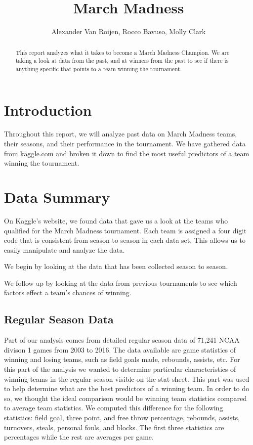 \documentclass[]{scrartcl}
\title{March Madness}
\author{Alexander Van Roijen, Rocco Bavuso, Molly Clark}
\begin{document}
\maketitle

\begin{abstract}
This report analyzes what it takes to become a March Madness Champion. We are taking a look at data from the past, and at winners from the past to see if there is anything specific that points to a team winning the tournament.
\end{abstract}

\section*{Introduction}
Throughout this report, we will analyze past data on March Madness teams, their seasons, and their performance in the tournament. We have gathered data from kaggle.com and broken it down to find the most useful predictors of a team winning the tournament.
\section*{Data Summary}
On Kaggle's website, we found data that gave us a look at the teams who qualified for the March Madness tournament. Each team is assigned a four digit code that is consistent from season to season in each data set. This allows us to easily manipulate and analyze the data.

We begin by looking at the data that has been collected season to season.

We follow up by looking at the data from previous tournaments to see which factors effect a team's chances of winning.
\subsection*{Regular Season Data}
Part of our analysis comes from detailed regular season data of 71,241 NCAA divison 1 games from 2003 to 2016. The data available are game statistics of winning and losing teams, such as field goals made, rebounds, assists, etc. For this part of the analysis we wanted to determine particular characteristics of winning teams in the regular season visible on the stat sheet. This part was used to help determine what are the best predictors of a winning team. In order to do so, we thought the ideal comparison would be winning team statistics compared to average team statistics. We computed this difference for the following statistics: field goal, three point, and free throw percentage, rebounds, assists, turnovers, steals, personal fouls, and blocks. The first three statistics are percentages while the rest are averages per game.  
\end{document}
